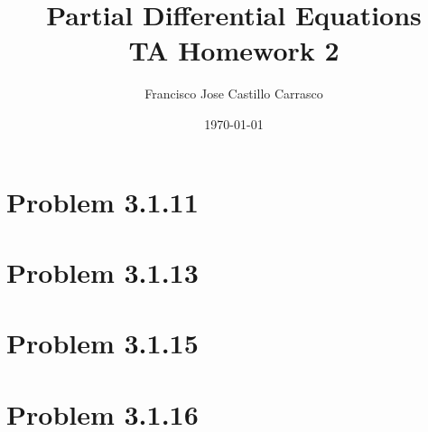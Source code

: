 




\title{Partial Differential Equations\\TA Homework 2}
\author{Francisco Jose Castillo Carrasco}
\date{\today}
\maketitle




\section*{Problem 3.1.11}

\newpage
\section*{Problem 3.1.13}


\section*{Problem 3.1.15}

\newpage
\section*{Problem 3.1.16}






